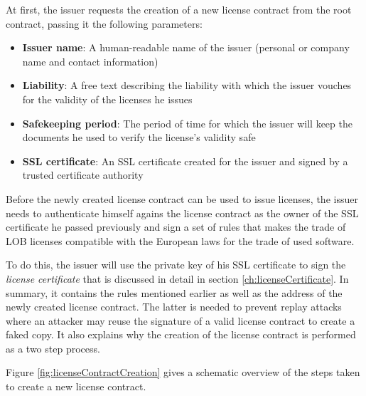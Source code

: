 \documentclass[a4paper]{article}
\begin{document}
At first, the issuer requests the creation of a new license contract from the root contract, passing it the following parameters:

\begin{itemize}
  \item \textbf{Issuer name}: A human-readable name of the issuer (personal or company name and contact information)
  \item \textbf{Liability}: A free text describing the liability with which the issuer vouches for the validity of the licenses he issues
  \item \textbf{Safekeeping period}: The period of time for which the issuer will keep the documents he used to verify the license's validity safe
  \item \textbf{SSL certificate}: An SSL certificate created for the issuer and signed by a trusted certificate authority
\end{itemize}

Before the newly created license contract can be used to issue licenses, the issuer needs to authenticate himself agains the license contract as the owner of the SSL certificate he passed previously and sign a set of rules that makes the trade of LOB licenses compatible with the European laws for the trade of used software.

To do this, the issuer will use the private key of his SSL certificate to sign the \emph{license certificate} that is discussed in detail in section \ref{ch:licenseCertificate}. In summary, it contains the rules mentioned earlier as well as the address of the newly created license contract. The latter is needed to prevent replay attacks where an attacker may reuse the signature of a valid license contract to create a faked copy. It also explains why the creation of the license contract is performed as a two step process.

Figure \ref{fig:licenseContractCreation} gives a schematic overview of the steps taken to create a new license contract.
\end{document}
